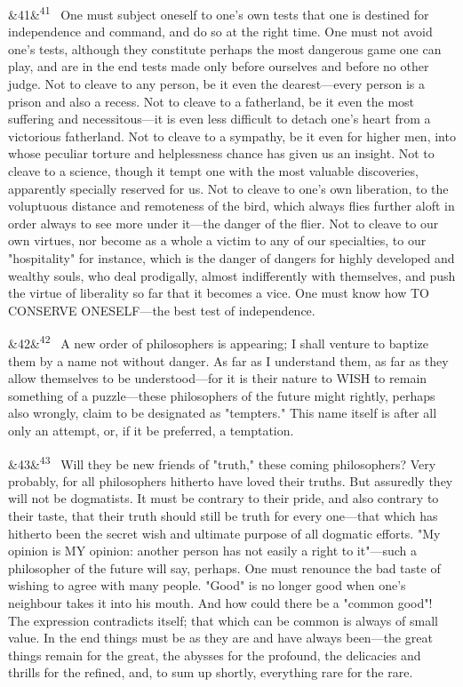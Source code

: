 \documentclass[12pt]{article}
\newcommand{\para}[1][]{\par\noindent\ifx&#1&\else\textsuperscript{\footnotesize #1}~\fi}
\begin{document}
\para[41] One must subject oneself to one's own tests that one is destined for independence and command, and do so at the right time. One must not avoid one's tests, although they constitute perhaps the most dangerous game one can play, and are in the end tests made only before ourselves and before no other judge. Not to cleave to any person, be it even the dearest---every person is a prison and also a recess. Not to cleave to a fatherland, be it even the most suffering and necessitous---it is even less difficult to detach one's heart from a victorious fatherland. Not to cleave to a sympathy, be it even for higher men, into whose peculiar torture and helplessness chance has given us an insight. Not to cleave to a science, though it tempt one with the most valuable discoveries, apparently specially reserved for us. Not to cleave to one's own liberation, to the voluptuous distance and remoteness of the bird, which always flies further aloft in order always to see more under it---the danger of the flier. Not to cleave to our own virtues, nor become as a whole a victim to any of our specialties, to our "hospitality" for instance, which is the danger of dangers for highly developed and wealthy souls, who deal prodigally, almost indifferently with themselves, and push the virtue of liberality so far that it becomes a vice. One must know how TO CONSERVE ONESELF---the best test of independence.

\para[42] A new order of philosophers is appearing; I shall venture to baptize them by a name not without danger. As far as I understand them, as far as they allow themselves to be understood---for it is their nature to WISH to remain something of a puzzle---these philosophers of the future might rightly, perhaps also wrongly, claim to be designated as "tempters." This name itself is after all only an attempt, or, if it be preferred, a temptation.

\para[43] Will they be new friends of "truth," these coming philosophers? Very probably, for all philosophers hitherto have loved their truths. But assuredly they will not be dogmatists. It must be contrary to their pride, and also contrary to their taste, that their truth should still be truth for every one---that which has hitherto been the secret wish and ultimate purpose of all dogmatic efforts. "My opinion is MY opinion: another person has not easily a right to it"---such a philosopher of the future will say, perhaps. One must renounce the bad taste of wishing to agree with many people. "Good" is no longer good when one's neighbour takes it into his mouth. And how could there be a "common good"! The expression contradicts itself; that which can be common is always of small value. In the end things must be as they are and have always been---the great things remain for the great, the abysses for the profound, the delicacies and thrills for the refined, and, to sum up shortly, everything rare for the rare.
\end{document}
